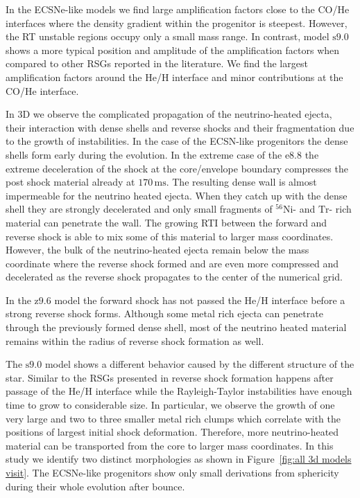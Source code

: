 \documentclass[fleqn,usenatbib]{mnras}
\newcommand{\nickel}{\ensuremath{\mathrm{^{56}Ni}}\xspace}
\newcommand{\tracer}{\ensuremath{\mathrm{Tr}}\xspace}
\newcommand{\ms}{\ensuremath{\text{ms}}}
\newcommand{\onemg}{\ensuremath{\mathrm{e8.8}}\xspace}
\newcommand{\snine}{\ensuremath{\mathrm{s9.0}}\xspace}
\newcommand{\znine}{\ensuremath{\mathrm{z9.6}}\xspace}
\begin{document}
In the ECSNe-like models we find large amplification factors close to the CO/He 
interfaces where the density gradient within the progenitor is steepest. 
However, the RT unstable regions occupy only a small mass range.
In contrast, model \snine shows a more typical position and amplitude of the 
amplification factors when compared to other RSGs reported in the literature.
We find the largest amplification factors around the He/H 
interface and minor contributions at the CO/He interface.

In 3D we observe the complicated propagation of the neutrino-heated ejecta, 
their interaction with dense shells and reverse shocks and their
fragmentation due to the growth of instabilities.
In the case of the ECSN-like progenitors the dense shells form 
early during the evolution. 
In the extreme case of the \onemg the 
extreme deceleration of the shock at the core/envelope boundary compresses 
the post shock material already at $170 \, \ms$. The resulting dense wall 
is almost impermeable for the neutrino heated ejecta. When they catch
up with the dense shell they are strongly decelerated and only small
fragments of \nickel- and \tracer- rich material can penetrate the wall.
The growing RTI between the forward and reverse shock is able to mix some
of this material to larger mass coordinates.
However, the bulk of the neutrino-heated ejecta remain below the mass 
coordinate where the reverse shock formed and are even more compressed
and decelerated as the reverse shock propagates to the center of the numerical
grid.

In the \znine model the forward shock has not passed the He/H interface 
before a strong reverse shock forms. Although some metal rich ejecta can 
penetrate through the previously formed dense shell, most of the neutrino 
heated material remains within the radius of reverse shock formation as well.

The \snine model shows a different behavior caused by the different structure 
of the star. Similar to the RSGs presented in \cite{Wongwathanarat2015} reverse 
shock formation happens after passage of the He/H interface while the Rayleigh-Taylor 
instabilities have enough time to grow to considerable size. 
In particular, we observe the growth of one very large and two to three smaller 
metal rich clumps which correlate with the positions of largest initial shock
deformation.
Therefore, more neutrino-heated material can be transported from the core 
to larger mass coordinates. 
In this study we identify two distinct morphologies as shown in Figure~\ref{fig:all 3d models visit}.
The ECSNe-like progenitors show only small derivations from sphericity 
during their whole evolution after bounce.
\end{document}
